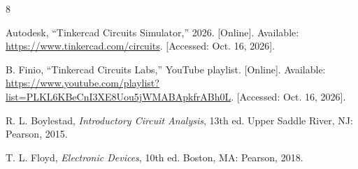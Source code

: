 \documentclass[11pt,a4paper]{article}
\begin{document}
\begin{thebibliography}{8}

Autodesk, ``Tinkercad Circuits Simulator,'' 2026. [Online]. Available: \url{https://www.tinkercad.com/circuits}. [Accessed: Oct. 16, 2026].

B. Finio, ``Tinkercad Circuits Labs,'' YouTube playlist. [Online]. Available: \url{https://www.youtube.com/playlist?list=PLKL6KBeCnI3XE8Uou5jWMABApkfrABh0L}. [Accessed: Oct. 16, 2026].

R. L. Boylestad, \emph{Introductory Circuit Analysis}, 13th ed. Upper Saddle River, NJ: Pearson, 2015.

T. L. Floyd, \emph{Electronic Devices}, 10th ed. Boston, MA: Pearson, 2018.

\end{thebibliography}
\end{document}
